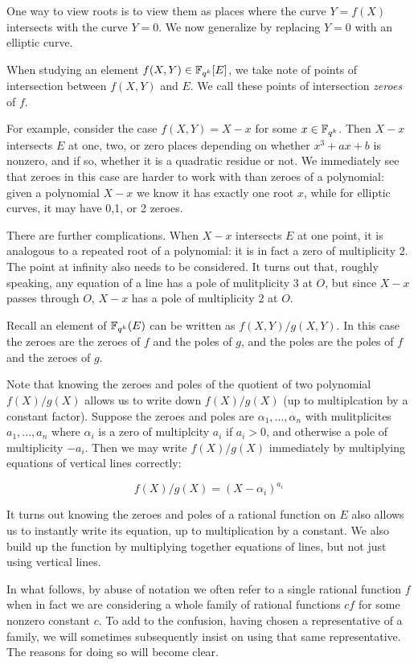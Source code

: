 One way to view roots is to view them as places where the curve $Y = f(X)$
intersects with the curve $Y = 0$. We now generalize by replacing $Y=0$
with an elliptic curve.

When studying an element $f(X,Y) \in \mathbb{F}_{q^k}[E]$, we take note of points of
intersection between $f(X,Y)$ and $E$.
We call these points of intersection \emph{zeroes} of $f$.

For example, consider the case $f(X,Y) = X-x$ for some $x\in\mathbb{F}_{q^k}$.
Then $X-x$ intersects $E$ at one, two, or zero places depending
on whether $x^3 + a x + b$ is nonzero, and if so, whether it is a quadratic
residue or not.
We immediately see that zeroes in this case are harder to work with than
zeroes of a polynomial: given a polynomial $X - x$ we know it has
exactly one root $x$, while for elliptic curves, it may have 0,1, or 2
zeroes.

There are further complications. When $X - x$ intersects $E$ at one point,
it is analogous to a repeated root of a polynomial: it is in
fact a zero of multiplicity 2. The point at infinity also needs to be
considered. It turns out that, roughly speaking, any equation of a line
has a pole of mulitplicity 3 at $O$, but since $X - x$ passes through $O$,
$X-x$ has a pole of multiplicity 2 at $O$.

Recall an element of $\mathbb{F}_{q^k}(E)$ can be written as $f(X,Y)/g(X,Y)$.
In this case the zeroes are the zeroes of $f$ and the poles of $g$,
and the poles are the poles of $f$ and the zeroes of $g$.

Note that knowing the zeroes and poles of the quotient of two
polynomial $f(X)/g(X)$ allows us to write down $f(X)/g(X)$ (up to multiplcation
by a constant factor). Suppose the zeroes and poles are $\alpha_1,...,\alpha_n$
with mulitplicites $a_1,...,a_n$ where $\alpha_i$ is a zero of multiplcity
$a_i$ if $a_i > 0$, and otherwise a pole of multiplicity $-a_i$. Then
we may write $f(X)/g(X)$ immediately by multiplying equations of
vertical lines correctly:

\[ f(X)/g(X) = (X-\alpha_i)^{a_i} \]

It turns out knowing the zeroes and poles of
a rational function on $E$ also allows us to instantly write its equation,
up to multiplication by a constant. We also build up the function by
multiplying together equations of lines, but not just using
vertical lines.

In what follows,
by abuse of notation we often refer to a single rational function
$f$ when in fact we are considering a whole family of rational functions
$c f$ for some nonzero constant $c$. To add to the confusion, having
chosen a representative of a family, we will sometimes subsequently
insist on using that same representative. The reasons for doing so
will become clear.

